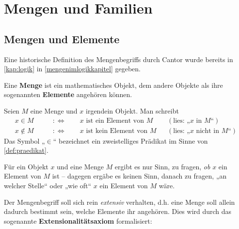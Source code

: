 


    
\chapter{Mengen und Familien} \label{kap:mengen}


\section{Mengen und Elemente}


Eine historische Definition des Mengenbegriffs durch Cantor wurde bereits in \cref{kap:logik} in \cref{mengenimlogikkapitel} gegeben.


\begin{defin}[Menge] \label{def:menge} 
    Eine \textbf{Menge} ist ein mathematisches Objekt, dem andere Objekte als ihre sogenannten \textbf{Elemente} angehören können.%
\end{defin}


\begin{nota}[Elementzeichen]
    Seien $M$ eine Menge und $x$ irgendein Objekt. Man schreibt
    \begin{align*}
        x  \in M \qquad&:\Leftrightarrow\qquad \text{$x$ ist ein Element von $M$} && (\text{lies: „$x$ in $M$“})\\
        x\notin M \qquad &:\Leftrightarrow\qquad \text{$x$ ist kein Element von $M$} && (\text{lies: „$x$ nicht in $M$“})
    \end{align*}
    Das Symbol „$\in$“ bezeichnet ein zweistelliges Prädikat im Sinne von \cref{def:praedikat}.
\end{nota}


\noindent Für ein Objekt $x$ und eine Menge $M$ ergibt es nur Sinn, zu fragen, \emph{ob} $x$ ein Element von $M$ ist -- dagegen ergäbe es keinen Sinn, danach zu fragen, „an welcher Stelle“ oder „wie oft“ $x$ ein Element von $M$ wäre.

Der Mengenbegriff soll sich rein \emph{extensiv} verhalten, d.h. eine Menge soll allein dadurch bestimmt sein, welche Elemente ihr angehören. Dies wird durch das sogenannte \textbf{Extensionalitätsaxiom} formalisiert:



